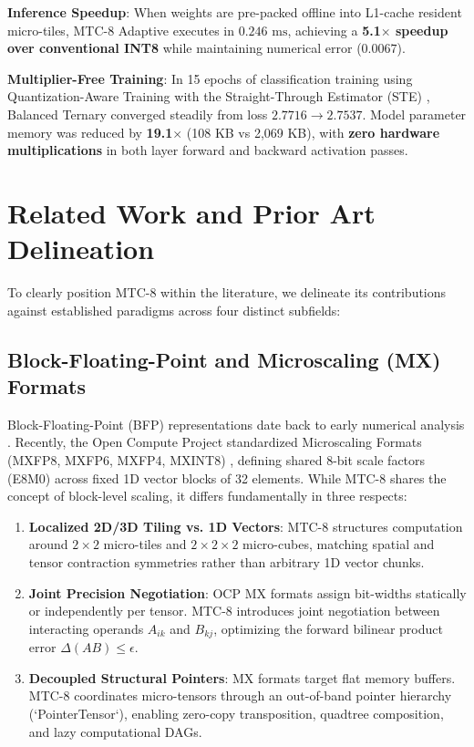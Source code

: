 \documentclass[11pt,a4paper]{article}
\begin{document}
\textbf{Inference Speedup}: When weights are pre-packed offline into L1-cache resident micro-tiles, MTC-8 Adaptive executes in $0.246\text{ ms}$, achieving a \textbf{5.1$\times$ speedup over conventional INT8} while maintaining numerical error ($0.0067$).

\textbf{Multiplier-Free Training}: In 15 epochs of classification training using Quantization-Aware Training with the Straight-Through Estimator (STE) \cite{bengio2013ste}, Balanced Ternary converged steadily from loss $2.7716 \to 2.7537$. Model parameter memory was reduced by \textbf{19.1$\times$} (108 KB vs 2,069 KB), with \textbf{zero hardware multiplications} in both layer forward and backward activation passes.

\section{Related Work and Prior Art Delineation}

To clearly position MTC-8 within the literature, we delineate its contributions against established paradigms across four distinct subfields:

\subsection{Block-Floating-Point and Microscaling (MX) Formats}
Block-Floating-Point (BFP) representations date back to early numerical analysis \cite{koster2017flexpoint}. Recently, the Open Compute Project standardized Microscaling Formats (MXFP8, MXFP6, MXFP4, MXINT8) \cite{rouhani2023microscaling, ocp2023mx}, defining shared 8-bit scale factors (E8M0) across fixed 1D vector blocks of 32 elements. 
While MTC-8 shares the concept of block-level scaling, it differs fundamentally in three respects:
\begin{enumerate}
    \item \textbf{Localized 2D/3D Tiling vs. 1D Vectors}: MTC-8 structures computation around $2\times 2$ micro-tiles and $2\times 2\times 2$ micro-cubes, matching spatial and tensor contraction symmetries rather than arbitrary 1D vector chunks.
    \item \textbf{Joint Precision Negotiation}: OCP MX formats assign bit-widths statically or independently per tensor. MTC-8 introduces joint negotiation between interacting operands $A_{ik}$ and $B_{kj}$, optimizing the forward bilinear product error $\Delta(AB) \le \epsilon$.
    \item \textbf{Decoupled Structural Pointers}: MX formats target flat memory buffers. MTC-8 coordinates micro-tensors through an out-of-band pointer hierarchy (`PointerTensor`), enabling zero-copy transposition, quadtree composition, and lazy computational DAGs.
\end{enumerate}
\end{document}
